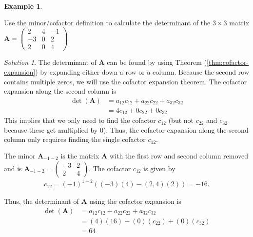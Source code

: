 \documentclass[
]{book}
\theoremstyle{definition}
\theoremstyle{definition}
\newtheorem{example}{Example}[chapter]
\theoremstyle{definition}
\theoremstyle{remark}
\newtheorem*{solution}{Solution}
\begin{document}
\begin{example}
\protect\hypertarget{exm:unlabeled-div-104}{}\label{exm:unlabeled-div-104}

Use the minor/cofactor definition to calculate the determinant of the \(3 \times 3\) matrix \(\mathbf{A} = \begin{pmatrix} 2 & 4 & -1 \\ -3 & 0 & 2 \\ 2 & 0 & 4 \end{pmatrix}\)

\end{example}

\begin{solution}

The determinant of \(\mathbf{A}\) can be found by using Theorem (\ref{thm:cofactor-expansion}) by expanding either down a row or a column. Because the second row contains multiple zeros, we will use the cofactor expansion theorem. The cofactor expansion along the second column is
\[
\begin{aligned}
\det(\mathbf{A}) & = a_{12} c_{12} + a_{22} c_{22} + a_{32} c_{32} \\
& = 4 c_{12} + 0 c_{22} + 0 c_{32}
\end{aligned}
\]
This implies that we only need to find the cofactor \(c_{12}\) (but not \(c_{22}\) and \(c_{32}\) because these get multiplied by 0). Thus, the cofactor expansion along the second column only requires finding the single cofactor \(c_{12}\).

The minor \(\mathbf{A}_{-1-2}\) is the matrix \(\mathbf{A}\) with the first row and second column removed and is \(\mathbf{A}_{-1-2} = \begin{pmatrix} -3 & 2 \\ 2 & 4 \end{pmatrix}\). The cofactor \(c_{12}\) is given by
\[
\begin{aligned}
c_{12} = (-1)^{1+2}((-3)(4) - (2, 4) (2)) = -16.
\end{aligned}
\]

Thus, the determinant of \(\mathbf{A}\) using the cofactor expansion is
\[
\begin{aligned}
\det(\mathbf{A}) & = a_{12} c_{12} + a_{22} c_{22} + a_{32} c_{32} \\
& = (4) (16) + (0) (c_{22}) + (0) (c_{32}) \\
& = 64
\end{aligned}
\]

\end{solution}
\end{document}

